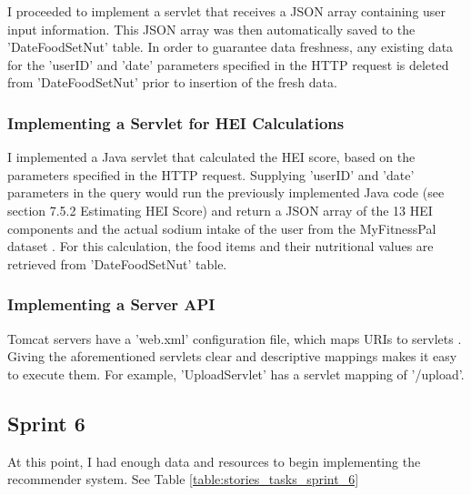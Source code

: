 \documentclass{article}
\begin{document}
\bigskip
\noindent I proceeded to implement a servlet that receives a JSON array containing user input information. This JSON array was then automatically saved to the 'DateFoodSetNut' table. In order to guarantee data freshness, any existing data for the 'userID' and 'date' parameters specified in the HTTP request is deleted from 'DateFoodSetNut' prior to insertion of the fresh data. 

\subsubsection{Implementing a Servlet for HEI Calculations}
I implemented a Java servlet that calculated the HEI score, based on the parameters specified in the HTTP request. Supplying 'userID' and
'date' parameters in the query would run the previously implemented Java code (see section 7.5.2 Estimating HEI Score) and return a JSON array of the 13 HEI components and the actual sodium intake of the user from the MyFitnessPal dataset \cite{diet_success_predictions}. For this calculation, the food items and their nutritional values are retrieved from 'DateFoodSetNut' table.

\subsubsection{Implementing a Server API}
Tomcat servers have a 'web.xml' configuration file, which maps URIs to servlets \cite{apache_tomcat_web_xml}. Giving the aforementioned servlets clear and descriptive mappings makes it easy to execute them. For example, 'UploadServlet' has a servlet mapping of '/upload'.

\subsection{Sprint 6}
At this point, I had enough data and resources to begin implementing the recommender system. See Table \ref{table:stories_tasks_sprint_6}
\end{document}
